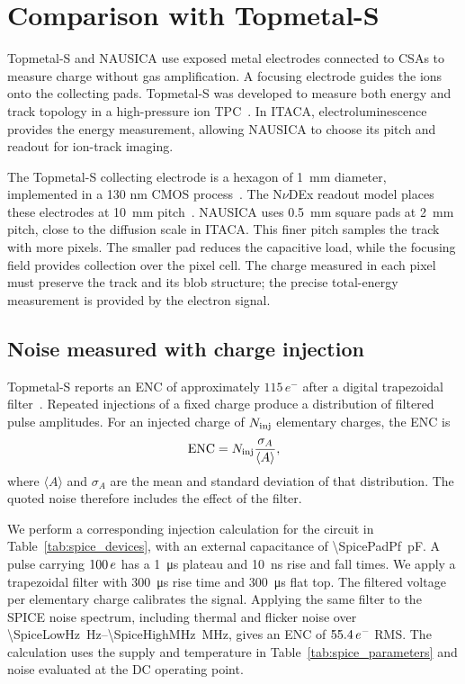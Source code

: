 \section{Comparison with Topmetal-S}
\label{app:topmetal}

Topmetal-S and NAUSICA use exposed metal electrodes connected to CSAs to
measure charge without gas amplification. A focusing electrode guides the
ions onto the collecting pads. Topmetal-S was developed to measure both
energy and track topology in a high-pressure ion TPC~\cite{mei2020topmetalcmosdirectcharge}.
In ITACA, electroluminescence provides the energy measurement, allowing
NAUSICA to choose its pitch and readout for ion-track imaging.

The Topmetal-S collecting electrode is a hexagon of \SI{1}{mm} diameter,
implemented in a 130 nm CMOS process~\cite{Liang2024TopmetalS}. The
N$\nu$DEx readout model places these electrodes at \SI{10}{mm}
pitch~\cite{Liang2026NvDExSimulation}. NAUSICA uses \SI{0.5}{mm} square
pads at \SI{2}{mm} pitch, close to the diffusion scale in ITACA. This
finer pitch samples the track with more pixels. The smaller pad reduces
the capacitive load, while the focusing field provides collection over
the pixel cell. The charge measured in each pixel must preserve the
track and its blob structure; the precise total-energy measurement is
provided by the electron signal.

\subsection{Noise measured with charge injection}

Topmetal-S reports an ENC of approximately $115\,e^-$ after a digital
trapezoidal filter~\cite{Yang2024TopmetalCSA}. Repeated injections of a
fixed charge produce a distribution of filtered pulse amplitudes. For
an injected charge of $N_{\rm inj}$ elementary charges, the ENC is
\begin{equation}
 \mathrm{ENC}=N_{\rm inj}\frac{\sigma_A}{\langle A\rangle},
\end{equation}
where $\langle A\rangle$ and $\sigma_A$ are the mean and standard deviation
of that distribution. The quoted noise therefore includes the effect
of the filter.

We perform a corresponding injection calculation for the circuit in
Table~\ref{tab:spice_devices}, with an external capacitance of
\SI{\SpicePadPf}{pF}. A pulse carrying
$100\,e$ has a \SI{1}{\micro\second} plateau
and \SI{10}{ns} rise and fall times. We apply a trapezoidal filter with
\SI{300}{\micro\second} rise time and \SI{300}{\micro\second} flat top.
The filtered voltage per elementary charge calibrates the signal. Applying
the same filter to the SPICE noise spectrum, including thermal and flicker
noise over \SI{\SpiceLowHz}{Hz}--\SI{\SpiceHighMHz}{MHz}, gives an ENC of
$55.4\,e^-$ RMS. The calculation uses the supply and
temperature in Table~\ref{tab:spice_parameters} and noise evaluated at
the DC operating point.

